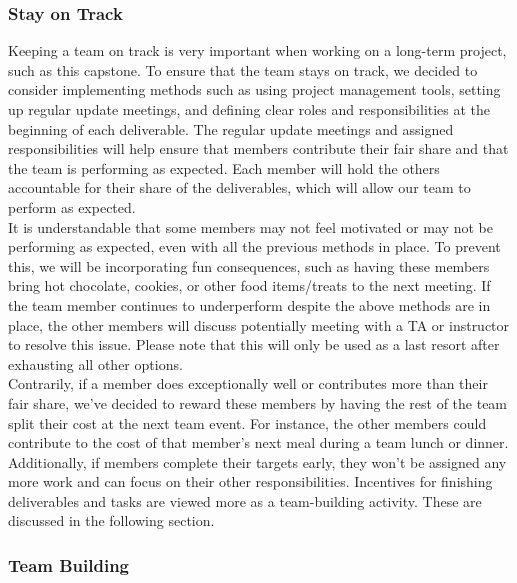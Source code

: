 \documentclass{article}
\begin{document}
\subsubsection*{Stay on Track}

Keeping a team on track is very important when working on a long-term project,
 such as this capstone. To ensure that the team stays on track, we decided to
 consider implementing methods such as using project management tools, setting
 up regular update meetings, and defining clear roles and responsibilities at
 the beginning of each deliverable. The regular update meetings and assigned
 responsibilities will help ensure that members contribute their fair share 
 and that the team is performing as expected. Each member will hold the others
 accountable for their share of the deliverables, which will allow our team 
 to perform as expected. \\

It is understandable that some members may not feel motivated or may not be
 performing as expected, even with all the previous methods in place.
 To prevent this, we will be incorporating fun consequences,
 such as having these members bring hot chocolate, cookies,
 or other food items/treats to the next meeting.
 If the team member continues to underperform despite the above
 methods are in place, the other members will discuss potentially 
 meeting with a TA or instructor to resolve this issue. 
 Please note that this will only be used as a last
 resort after exhausting all other options. \\

Contrarily, if a member does exceptionally well or contributes more 
than their fair share, we’ve decided to reward these members by having 
the rest of the team split their cost at the next team event. 
For instance, the other members could contribute to the cost of 
that member’s next meal during a team lunch or dinner. \\

Additionally, if members complete their targets early, 
they won’t be assigned any more work and can focus on 
their other responsibilities. 
Incentives for finishing deliverables and tasks are 
viewed more as a team-building activity. 
These are discussed in the following section. \\


\subsubsection*{Team Building}
\end{document}
